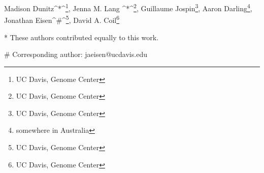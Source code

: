Madison Dunitz^*^\footnote{UC Davis, Genome Center}, Jenna M. Lang ^*^\footnote{UC Davis, Genome Center}, Guillaume Jospin\footnote{UC Davis, Genome Center}, Aaron Darling\footnote{somewhere in Australia}, Jonathan Eisen^\#^\footnote{UC Davis, Genome Center}, David A. Coil\footnote{UC Davis, Genome Center} 

* These authors contributed equally to this work.

# Corresponding author: jaeisen@ucdavis.edu